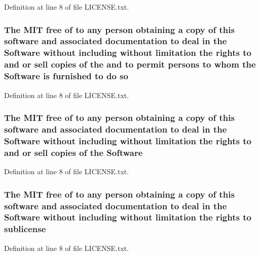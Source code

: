 Definition at line 8 of file L\-I\-C\-E\-N\-S\-E.\-txt.

\hypertarget{LICENSE_8txt_ab05c0f0392781fce452b91e1ede41d90}{
\subsubsection[{so}]{\setlength{\rightskip}{0pt plus 5cm}The M\-I\-T free of to any person obtaining a {\bf copy} of this software and associated documentation to deal in the {\bf Software} without including without limitation the rights to and or sell copies of the and to permit persons to whom the {\bf Software} is furnished to do so}}\label{LICENSE_8txt_ab05c0f0392781fce452b91e1ede41d90}


Definition at line 8 of file L\-I\-C\-E\-N\-S\-E.\-txt.

\hypertarget{LICENSE_8txt_a22a1529885b3e9d66b0c72fe604fc3dc}{
\subsubsection[{Software}]{\setlength{\rightskip}{0pt plus 5cm}The M\-I\-T free of to any person obtaining a {\bf copy} of this software and associated documentation to deal in the Software without including without limitation the rights to and or sell copies of the Software}}\label{LICENSE_8txt_a22a1529885b3e9d66b0c72fe604fc3dc}


Definition at line 8 of file L\-I\-C\-E\-N\-S\-E.\-txt.

\hypertarget{LICENSE_8txt_af9fad5470a0b4e968d19b11b7c643fdb}{
\subsubsection[{sublicense}]{\setlength{\rightskip}{0pt plus 5cm}The M\-I\-T free of to any person obtaining a {\bf copy} of this software and associated documentation to deal in the {\bf Software} without including without limitation the rights to sublicense}}\label{LICENSE_8txt_af9fad5470a0b4e968d19b11b7c643fdb}


Definition at line 8 of file L\-I\-C\-E\-N\-S\-E.\-txt.

